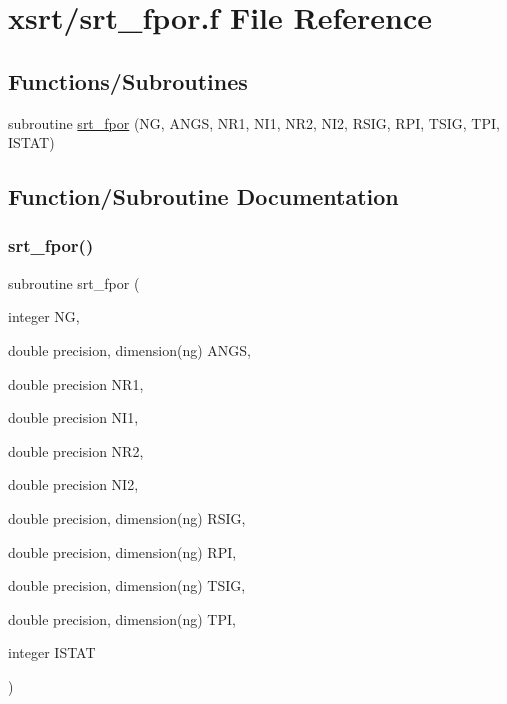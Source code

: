 \hypertarget{srt__fpor_8f}{}\section{xsrt/srt\+\_\+fpor.f File Reference}
\label{srt__fpor_8f}
\subsection*{Functions/\+Subroutines}
\begin{DoxyCompactItemize}
\item 
subroutine \hyperlink{srt__fpor_8f_a8bb81881f018be7106895608e706a18e}{srt\+\_\+fpor} (NG, A\+N\+GS, N\+R1, N\+I1, N\+R2, N\+I2, R\+S\+IG, R\+PI, T\+S\+IG, T\+PI, I\+S\+T\+AT)
\end{DoxyCompactItemize}


\subsection{Function/\+Subroutine Documentation}
\mbox{\label{srt__fpor_8f_a8bb81881f018be7106895608e706a18e}} 
\subsubsection{\texorpdfstring{srt\+\_\+fpor()}{srt\_fpor()}}
{\footnotesize\ttfamily subroutine srt\+\_\+fpor (\begin{DoxyParamCaption}\item[{integer}]{NG,  }\item[{double precision, dimension(ng)}]{A\+N\+GS,  }\item[{double precision}]{N\+R1,  }\item[{double precision}]{N\+I1,  }\item[{double precision}]{N\+R2,  }\item[{double precision}]{N\+I2,  }\item[{double precision, dimension(ng)}]{R\+S\+IG,  }\item[{double precision, dimension(ng)}]{R\+PI,  }\item[{double precision, dimension(ng)}]{T\+S\+IG,  }\item[{double precision, dimension(ng)}]{T\+PI,  }\item[{integer}]{I\+S\+T\+AT }\end{DoxyParamCaption})}


